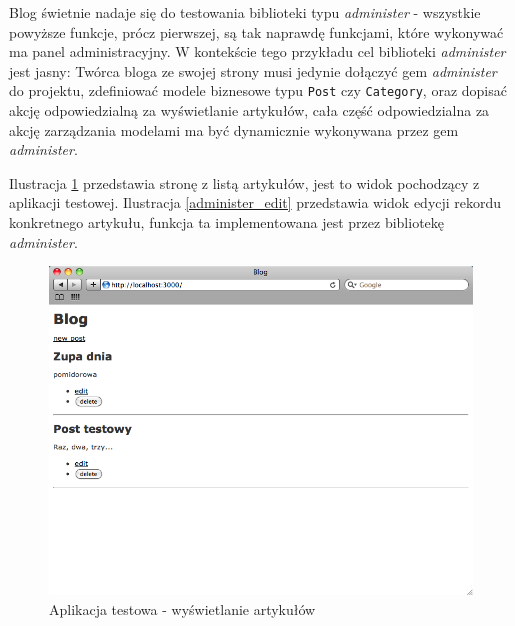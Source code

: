   Blog świetnie nadaje się do testowania biblioteki typu \emph{administer} - wszystkie powyższe funkcje, prócz pierwszej, są tak naprawdę funkcjami, które wykonywać ma panel administracyjny. W kontekście tego przykładu cel biblioteki \emph{administer} jest jasny: Twórca bloga ze swojej strony musi jedynie dołączyć gem \emph{administer} do projektu, zdefiniować modele biznesowe typu \texttt{Post} czy \texttt{Category}, oraz dopisać akcję odpowiedzialną za wyświetlanie artykułów, cała część odpowiedzialna za akcję zarządzania modelami ma być dynamicznie wykonywana przez gem \emph{administer}. 
  
  Ilustracja \ref{blog_view} przedstawia stronę z listą artykułów, jest to widok pochodzący z aplikacji testowej. Ilustracja \ref{administer_edit} przedstawia widok edycji rekordu konkretnego artykułu, funkcja ta implementowana jest przez bibliotekę \emph{administer}.
  
  \vspace{5 mm}
  \begin{figure}[!h]
		\begin{center}
			\includegraphics[width=\linewidth]{images/blog.png}
			\caption{Aplikacja testowa - wyświetlanie artykułów}
			\label{blog_view}
		\end{center}
	\end{figure}
	
	\clearpage
	
